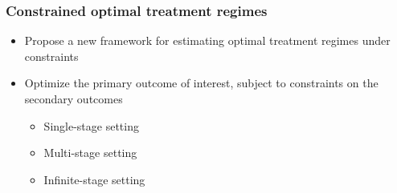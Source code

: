 \documentclass[unknownkeysallowed]{beamer}
\begin{document}
\begin{frame}
\frametitle{Constrained optimal treatment regimes}
	\begin{itemize}
	 \item Propose a new framework for estimating optimal treatment regimes under
constraints
	 \item Optimize the primary outcome of interest, subject to constraints on the
secondary outcomes 
 	\begin{itemize}
	 	\item Single-stage setting
	 	\item Multi-stage setting
	 	\item Infinite-stage setting
	 \end{itemize}
	 \end{itemize}
\end{frame}
\end{document}
